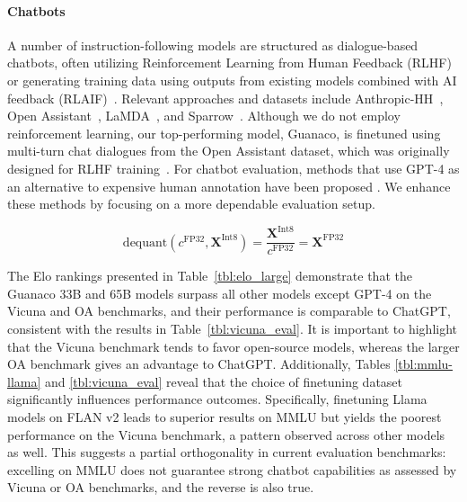 \paragraph{Chatbots} A number of instruction-following models are structured as dialogue-based chatbots, often utilizing Reinforcement Learning from Human Feedback (RLHF)~\citep{christiano2017deep} or generating training data using outputs from existing models combined with AI feedback (RLAIF)~\citep{bai2022constitutional}. Relevant approaches and datasets include Anthropic-HH~\citep{askell2021general,bai2022training}, Open Assistant~\citep{kopf2023openassistant}, LaMDA~\citep{thoppilan2022lamda}, and Sparrow~\citep{glaese2022improving}. Although we do not employ reinforcement learning, our top-performing model, Guanaco, is finetuned using multi-turn chat dialogues from the Open Assistant dataset, which was originally designed for RLHF training~\citep{kopf2023openassistant}. For chatbot evaluation, methods that use GPT-4 as an alternative to expensive human annotation have been proposed \citep{vicuna2023,peng2023instruction}. We enhance these methods by focusing on a more dependable evaluation setup.

\begin{equation}
    \text{dequant}(c^{\text{FP32}}, \mathbf{X}^{\text{Int8}}) = \frac{\mathbf{X}^{\text{Int8}}}{c^{\text{FP32}}} = \mathbf{X}^{\text{FP32}}
\end{equation}

The Elo rankings presented in Table~\ref{tbl:elo_large} demonstrate that the {Guanaco} 33B and 65B models surpass all other models except GPT-4 on the Vicuna and OA benchmarks, and their performance is comparable to ChatGPT, consistent with the results in Table~\ref{tbl:vicuna_eval}. It is important to highlight that the Vicuna benchmark tends to favor open-source models, whereas the larger OA benchmark gives an advantage to ChatGPT. Additionally, Tables \ref{tbl:mmlu-llama} and \ref{tbl:vicuna_eval} reveal that the choice of finetuning dataset significantly influences performance outcomes. Specifically, finetuning Llama models on FLAN v2 leads to superior results on MMLU but yields the poorest performance on the Vicuna benchmark, a pattern observed across other models as well. This suggests a partial orthogonality in current evaluation benchmarks: excelling on MMLU does not guarantee strong chatbot capabilities as assessed by Vicuna or OA benchmarks, and the reverse is also true.

